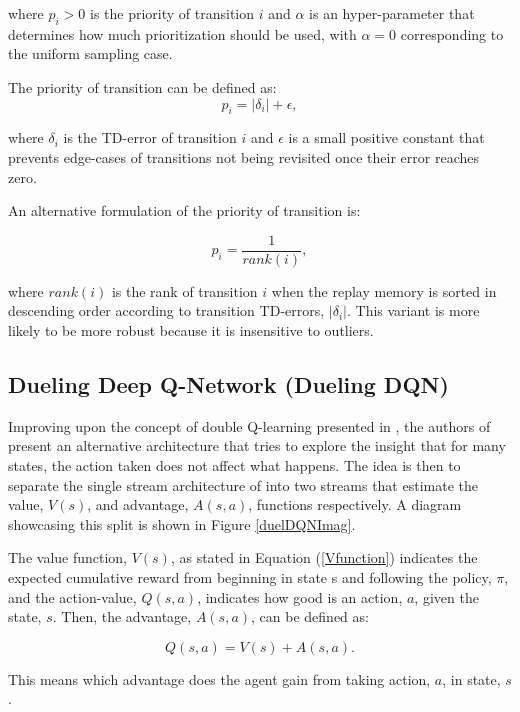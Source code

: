where $p_i>0$ is the priority of transition $i$ and $\alpha$ is an hyper-parameter that determines how much prioritization should be used, with $\alpha = 0$ corresponding to the uniform sampling case.

The priority of transition can be defined as:
\begin{equation}
    p_i = |\delta_i|+\epsilon ,
\end{equation}

where $\delta_i$ is the \acrshort{TD}-error of transition $i$ and $\epsilon$ is a small positive constant that prevents edge-cases of transitions not being revisited once their error reaches zero.

An alternative formulation of the priority of transition is:

\begin{equation}
    p_i = \frac{1}{rank(i)} ,
\end{equation}

where $rank(i)$ is the rank of transition $i$ when the replay memory is sorted in descending order according to transition \acrshort{TD}-errors, $|\delta_i|$. This variant is more likely to be more robust because it is insensitive to outliers.

\subsection{Dueling Deep Q-Network (Dueling DQN)}
\noindent Improving upon the concept of double Q-learning presented in \cite{doubleDQN}, the authors of \cite{duelingDQN} present an alternative architecture that tries to explore the insight that for many states, the action taken does not affect what happens. The idea is then to separate the single stream architecture of \cite{DQN} into two streams that estimate the value, $V(s)$, and advantage, $A(s,a)$, functions respectively. A diagram showcasing this split is shown in Figure \ref{duelDQNImag}. 

The value function, $V(s)$, as stated in Equation (\ref{Vfunction}) indicates the expected cumulative reward from beginning in state s and following the policy, $\pi$, and the action-value, $Q(s,a)$, indicates how good is an action, $a$, given the state, $s$. Then, the advantage, $A(s,a)$, can be defined as:

\begin{equation}\label{Qfunction}
Q(s,a) = V(s)+A(s,a) .
\end{equation}

This means which advantage does the agent gain from taking action, $a$, in state, $s$. 

